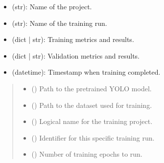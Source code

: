 \documentclass[letterpaper,10pt,english]{sphinxmanual}
\begin{document}
\begin{fulllineitems}
\begin{description}
\begin{itemize}
\item {} 
\sphinxAtStartPar
{} (str): Name of the project.

\item {} 
\sphinxAtStartPar
{} (str): Name of the training run.

\item {} 
\sphinxAtStartPar
{} (dict | str): Training metrics and results.

\item {} 
\sphinxAtStartPar
{} (dict | str): Validation metrics and results.

\item {} 
\sphinxAtStartPar
{} (datetime): Timestamp when training completed.

\end{itemize}

\end{description}
\begin{quote}\begin{description}
\begin{itemize}
\item {} 
\sphinxAtStartPar
{} () \textendash{} Path to the pretrained YOLO model.

\item {} 
\sphinxAtStartPar
{} () \textendash{} Path to the dataset used for training.

\item {} 
\sphinxAtStartPar
{} () \textendash{} Logical name for the training project.

\item {} 
\sphinxAtStartPar
{} () \textendash{} Identifier for this specific training run.

\item {} 
\sphinxAtStartPar
{} () \textendash{} Number of training epochs to run.


\end{itemize}
\end{description}
\end{quote}
\end{fulllineitems}
\end{document}

